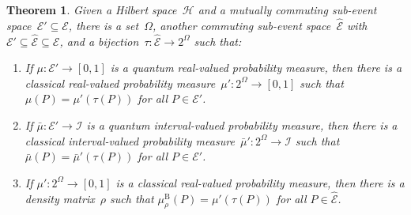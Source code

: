 \documentclass[12pt]{iopart}
\theoremstyle{plain}
\newtheorem{thm}{Theorem}
\theoremstyle{definition}
\theoremstyle{remark}
\newcommand{\Hilb}{\mathcal{H}}
\newcommand{\events}{\ensuremath{\mathcal{E}}}
\begin{document}
\begin{thm}\label{thm:sub-event-space}Given a Hilbert space~$\Hilb$
and a mutually commuting sub-event space~$\events'\subseteq\events$,
there is a set~$\Omega$, another commuting sub-event space~$\widehat{\events}$
with $\events'\subseteq\widehat{\events}\subseteq\events$, and a
bijection~$\tau:\widehat{\events}\rightarrow2^{\Omega}$ such that:
\begin{enumerate}
\item \label{enu:sub-event-space-real-quantum2classical}If $\mu:\events'\rightarrow\left[0,1\right]$
is a quantum real-valued probability measure, then there is a classical
real-valued probability measure~$\mu':2^{\Omega}\rightarrow\left[0,1\right]$
such that $\mu\left(P\right)=\mu'\left(\tau\left(P\right)\right)$
for all $P\in\events'$.
\item \label{enu:sub-event-space-interval-quantum2classical}If $\bar{\mu}:\events'\rightarrow\mathscr{I}$
is a quantum interval-valued probability measure, then there is a
classical interval-valued probability measure~$\bar{\mu}':2^{\Omega}\rightarrow\mathscr{I}$
such that $\bar{\mu}\left(P\right)=\bar{\mu}'\left(\tau\left(P\right)\right)$
for all $P\in\events'$.
\item \label{enu:sub-event-space-real-classical2quantum}If $\mu':2^{\Omega}\rightarrow\left[0,1\right]$
is a classical real-valued probability measure, then there is a density
matrix~$\rho$ such that $\mu_{\rho}^{\mathrm{B}}\left(P\right)=\mu'\left(\tau\left(P\right)\right)$
for all $P\in\widehat{\events}$.
\end{enumerate}
\end{thm}
\end{document}
